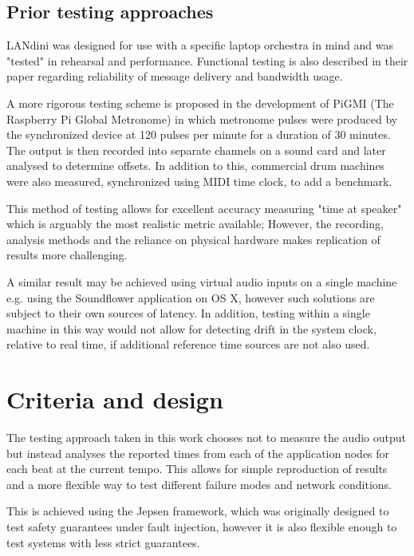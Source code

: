 \documentclass[11pt]{article} %
\theoremstyle{plain}
\theoremstyle{definition}
\begin{document}
\subsection{Prior testing approaches}

LANdini\cite{narveson2013landini} was designed for use with a specific laptop
orchestra in mind and was "tested" in rehearsal and performance. Functional
testing is also described in their paper regarding reliability of message
delivery and bandwidth usage.

A more rigorous testing scheme is proposed in the development of
PiGMI\cite{Oda2016} (The Raspberry Pi Global Metronome) in which metronome
pulses were produced by the synchronized device at 120 pulses per minute for a
duration of 30 minutes. The output is then recorded into separate channels on a
sound card and later analysed to determine offsets. In addition to this,
commercial drum machines were also measured, synchronized using MIDI time
clock, to add a benchmark.

This method of testing allows for excellent accuracy measuring "time at
speaker" which is arguably the most realistic metric available; However, the
recording, analysis methods and the reliance on physical hardware makes
replication of results more challenging.

A similar result may be achieved using virtual audio inputs on a single machine
e.g. using the Soundflower application on OS X, however such solutions are
subject to their own sources of latency. In addition, testing within a single
machine in this way would not allow for detecting drift in the system clock,
relative to real time, if additional reference time sources are not also used.

\section{Criteria and design}

The testing approach taken in this work chooses not to measure the audio output
but instead analyses the reported times from each of the application nodes for
each beat at the current tempo.  This allows for simple reproduction of results
and a more flexible way to test different failure modes and network conditions.

This is achieved using the Jepsen framework\cite{jepsen}, which was
originally designed to test safety guarantees under fault injection, however it
is also flexible enough to test systems with less strict guarantees.
\end{document}
